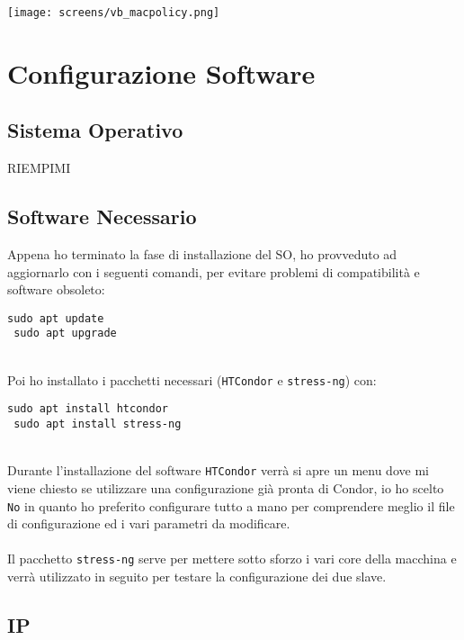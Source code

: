\begin{center}
	\texttt{[image: screens/vb\_macpolicy.png]}
\end{center}

\section{Configurazione Software}

\subsection{Sistema Operativo}

RIEMPIMI

\subsection{Software Necessario}

Appena ho terminato la fase di installazione del SO, ho provveduto ad aggiornarlo con i
seguenti comandi, per evitare problemi di compatibilit\`{a} e software obsoleto:

\begin{lstlisting}[style=cmd]
 sudo apt update
 sudo apt upgrade
\end{lstlisting}
\ \\
Poi ho installato i pacchetti necessari (\lstinline[style=cmd]|HTCondor| e \lstinline[style=cmd]|stress-ng|) con:

\begin{lstlisting}[style=cmd]
 sudo apt install htcondor 
 sudo apt install stress-ng
\end{lstlisting}
\ \\
Durante l'installazione del software \lstinline[style=cmd]|HTCondor| verr\`{a} si apre un menu dove mi viene chiesto se utilizzare una configurazione gi\`{a} pronta di Condor, io ho scelto \lstinline[style=cmd]|No| in quanto ho preferito configurare tutto a mano per comprendere meglio il file di configurazione ed i vari parametri da modificare.\\
\ \\
Il pacchetto \lstinline[style=cmd]|stress-ng| serve per mettere sotto sforzo i vari core della macchina e verr\`{a} utilizzato in seguito per testare la configurazione dei due slave.

\subsection{IP}

